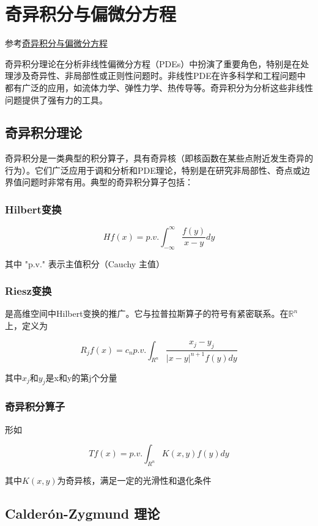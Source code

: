 \documentclass{article}
\begin{document}
\section{奇异积分与偏微分方程}

参考\href{https://mp.weixin.qq.com/s/4aJj3XwtXHEj0q_edUZzOA}{奇异积分与偏微分方程}

奇异积分理论在分析非线性偏微分方程（PDEs）中扮演了重要角色，特别是在处理涉及奇异性、非局部性或正则性问题时。非线性PDE在许多科学和工程问题中都有广泛的应用，如流体力学、弹性力学、热传导等。奇异积分为分析这些非线性问题提供了强有力的工具。

\subsection{奇异积分理论}

奇异积分是一类典型的积分算子，具有奇异核（即核函数在某些点附近发生奇异的行为）。它们广泛应用于调和分析和PDE理论，特别是在研究非局部性、奇点或边界值问题时非常有用。典型的奇异积分算子包括：

\subsubsection{Hilbert变换}

\[ Hf(x) = p.v. \int_{-\infty}^{\infty} \dfrac{f(y)}{x-y}dy \]

其中 "p.v." 表示主值积分（Cauchy 主值）

\subsubsection{Riesz变换}
是高维空间中Hilbert变换的推广。它与拉普拉斯算子的符号有紧密联系。在\(\mathbb{R}^n\)上，定义为

\[ R_jf(x) = c_n p.v. \int_{R^n} \dfrac{x_j - y_j}{|x-y|^{n+1}f(y)dy} \]

其中$x_j$和$y_j$是x和y的第j个分量

\subsubsection{奇异积分算子}

形如

\[ Tf(x) = p.v. \int_{R^n} K(x,y)f(y)dy \]

其中\( K(x,y)\)为奇异核，满足一定的光滑性和退化条件


\subsection{Calderón-Zygmund 理论}
\end{document}
